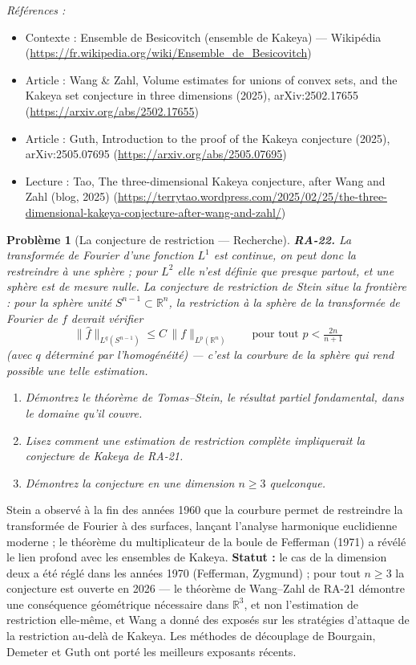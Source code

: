 \documentclass[11pt]{article}
\newtheorem{problem}{Problème}
\newenvironment{refs}{\par\small\noindent\emph{Références :}\begin{itemize}\setlength\itemsep{0pt}}{\end{itemize}\normalsize}
\begin{document}
\begin{refs}
\item Contexte : Ensemble de Besicovitch (ensemble de Kakeya) --- Wikipédia (\url{https://fr.wikipedia.org/wiki/Ensemble_de_Besicovitch})
\item Article : Wang \& Zahl, \og{} Volume estimates for unions of convex sets, and the Kakeya set conjecture in three dimensions \fg{} (2025), arXiv:2502.17655 (\url{https://arxiv.org/abs/2502.17655})
\item Article : Guth, \og{} Introduction to the proof of the Kakeya conjecture \fg{} (2025), arXiv:2505.07695 (\url{https://arxiv.org/abs/2505.07695})
\item Lecture : Tao, \og{} The three-dimensional Kakeya conjecture, after Wang and Zahl \fg{} (blog, 2025) (\url{https://terrytao.wordpress.com/2025/02/25/the-three-dimensional-kakeya-conjecture-after-wang-and-zahl/})
\end{refs}

\bigskip

\begin{problem}[{La conjecture de restriction --- Recherche}]
\textbf{RA-22.} La transformée de Fourier d'une fonction $ L^1 $ est
continue, on peut donc la restreindre à une sphère ; pour $ L^2 $ elle n'est définie que presque
partout, et une sphère est de mesure nulle. La conjecture de restriction de Stein situe la
frontière : pour la sphère unité $ S^{n-1} \subset \mathbb{R}^n $, la restriction à la sphère de
la transformée de Fourier de $ f $ devrait vérifier
\[ \| \hat{f} \|_{L^q(S^{n-1})} \le C \, \| f \|_{L^p(\mathbb{R}^n)}
\qquad \text{pour tout } p < \tfrac{2n}{n+1} \]
(avec $ q $ déterminé par l'homogénéité) --- c'est la courbure de la sphère qui rend possible une
telle estimation.
\begin{enumerate}
\item[(a)] Démontrez le théorème de Tomas--Stein, le résultat partiel fondamental,
dans le domaine qu'il couvre.
\item[(b)] Lisez comment une estimation de restriction complète impliquerait la conjecture de Kakeya de
RA-21.
\item[(c)] Démontrez la conjecture en une dimension $ n \ge 3 $ quelconque.
\end{enumerate}

\end{problem}

\noindent Stein a observé à la fin des années 1960 que la courbure permet de restreindre
la transformée de Fourier à des surfaces, lançant l'analyse harmonique euclidienne moderne ; le
théorème du multiplicateur de la boule de Fefferman (1971) a révélé le lien profond avec les
ensembles de Kakeya. \textbf{Statut :} le cas de la dimension deux a été réglé dans les années 1970
(Fefferman, Zygmund) ; pour tout $ n \ge 3 $ la conjecture est ouverte en 2026 --- le théorème de
Wang--Zahl de RA-21 démontre une conséquence géométrique nécessaire dans $ \mathbb{R}^3 $, et non
l'estimation de restriction elle-même, et Wang a donné des exposés sur les stratégies d'attaque de
la restriction au-delà de Kakeya. Les méthodes de découplage de Bourgain, Demeter et Guth ont porté
les meilleurs exposants récents.
\end{document}
